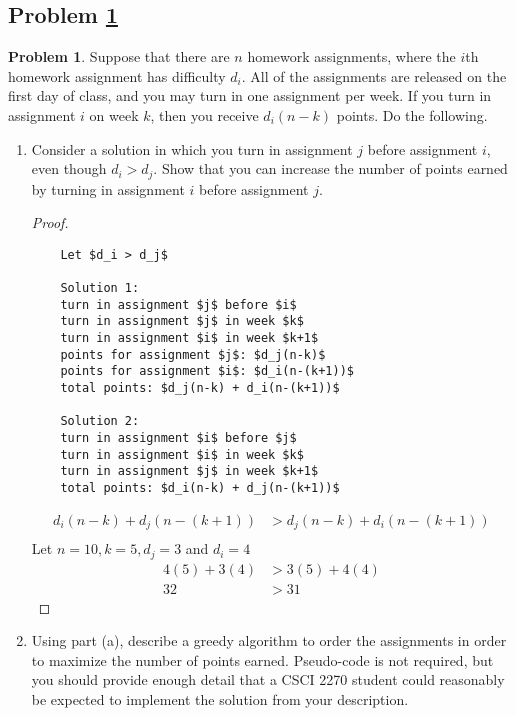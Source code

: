 \documentclass[11pt]{article}
\theoremstyle{definition}
\theoremstyle{definition}
\newtheorem{required}{Problem}
\theoremstyle{definition}
\begin{document}
\subsection{Problem \ref{DFS1}}
\begin{required} \label{DFS1}
Suppose that there are $n$ homework assignments, where the $i$th homework assignment has difficulty $d_{i}$. All of the assignments are released on the first day of class, and you may turn in one assignment per week. If you turn in assignment $i$ on week $k$, then you receive $d_{i}(n-k)$ points. Do the following.

\begin{enumerate}[label=(\alph*)]
\item Consider a solution in which you turn in assignment $j$ before assignment $i$, even though $d_{i} > d_{j}$. Show that you can increase the number of points earned by turning in assignment $i$ before assignment $j$.

\begin{proof} $ $ \\
\begin{lstlisting}
    Let $d_i > d_j$ 
    
    Solution 1: 
    turn in assignment $j$ before $i$ 
    turn in assignment $j$ in week $k$
    turn in assignment $i$ in week $k+1$
    points for assignment $j$: $d_j(n-k)$
    points for assignment $i$: $d_i(n-(k+1))$
    total points: $d_j(n-k) + d_i(n-(k+1))$
    
    Solution 2: 
    turn in assignment $i$ before $j$ 
    turn in assignment $i$ in week $k$
    turn in assignment $j$ in week $k+1$
    total points: $d_i(n-k) + d_j(n-(k+1))$
\end{lstlisting}

\begin{align*}
        d_i(n-k) + d_j(n-(k+1)) &> d_j(n-k) + d_i(n-(k+1)) \\
\end{align*}    
Let $n=10,k=5,d_j =3$ and $d_i=4$
\begin{align*}
        4(5) + 3(4) &> 3(5) + 4(4) \\
        32 &> 31
\end{align*}   
\end{proof}


\vskip 50pt
\item Using part (a), describe a greedy algorithm to order the assignments in order to maximize the number of points earned. Pseudo-code is not required, but you should provide enough detail that a CSCI 2270 student could reasonably be expected to implement the solution from your description.


\end{enumerate}
\end{required}
\end{document}
